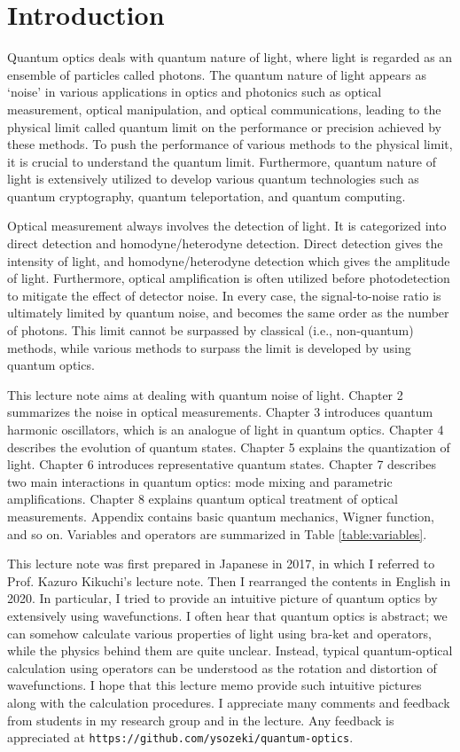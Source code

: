 \chapter{Introduction}
Quantum optics deals with quantum nature of light, where light is regarded as an ensemble of particles called photons. The quantum nature of light appears as `noise' in various applications in optics and photonics such as optical measurement, optical manipulation, and optical communications, leading to the physical limit called quantum limit on the performance or precision achieved by these methods. To push the performance of various methods to the physical limit, it is crucial to understand the quantum limit. Furthermore, quantum nature of light is extensively utilized to develop various quantum technologies such as quantum cryptography, quantum teleportation, and quantum computing. 

Optical measurement always involves the detection of light. It is categorized into direct detection and homodyne/heterodyne detection. Direct detection gives the intensity of light, and homodyne/heterodyne detection which gives the amplitude of light. Furthermore, optical amplification is often utilized before photodetection to mitigate the effect of detector noise. In every case, the signal-to-noise ratio is ultimately limited by quantum noise, and becomes the same order as the number of photons. This limit cannot be surpassed by classical (i.e., non-quantum) methods, while various methods to surpass the limit is developed by using quantum optics.

This lecture note aims at dealing with quantum noise of light. Chapter 2 summarizes the noise in optical measurements. Chapter 3 introduces quantum harmonic oscillators, which is an analogue of light in quantum optics. Chapter 4 describes the evolution of quantum states. Chapter 5 explains the quantization of light. Chapter 6 introduces representative quantum states. Chapter 7 describes two main interactions in quantum optics: mode mixing and parametric amplifications. Chapter 8 explains quantum optical treatment of optical measurements. Appendix contains basic quantum mechanics, Wigner function, and so on. Variables and operators are summarized in Table \ref{table:variables}.



This lecture note was first prepared in Japanese in 2017, in which I referred to Prof. Kazuro Kikuchi's lecture note. Then I rearranged the contents in English in 2020. In particular, I tried to provide an intuitive picture of quantum optics by extensively using wavefunctions. I often hear that quantum optics is abstract; we can somehow calculate various properties of light using bra-ket and operators, while the physics behind them are quite unclear. Instead, typical quantum-optical calculation using operators can be understood as the rotation and distortion of wavefunctions. I hope that this lecture memo provide such intuitive pictures along with the calculation procedures.  I appreciate many comments and feedback from students in my research group and in the lecture. Any feedback is appreciated at \texttt{https://github.com/ysozeki/quantum-optics}.

